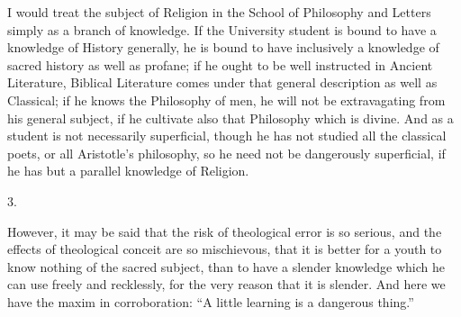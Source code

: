 I would treat the subject of Religion in the School of Philosophy
and Letters simply as a branch of knowledge. If the University student
is bound to have a knowledge of History generally, he is bound to have
inclusively a knowledge of sacred history as well as profane; if he
ought to be well instructed in Ancient Literature, Biblical Literature
comes under that general description as well as Classical; if he
knows the Philosophy of men, he will not be extravagating from his
general subject, if he cultivate also that Philosophy which is divine.
And as a student is not necessarily superficial, though he has not
studied all the classical poets, or all Aristotle's philosophy, so he
need not be dangerously superficial, if he has but a parallel
knowledge of Religion.

3.

However, it may be said that the risk of theological error is so
serious, and the effects of theological conceit are so mischievous,
that it is better for a youth to know nothing of the sacred subject,
than to have a slender knowledge which he can use freely and
recklessly, for the very reason that it is slender. And here we have
the maxim in corroboration: ``A little learning is a dangerous
thing.''

